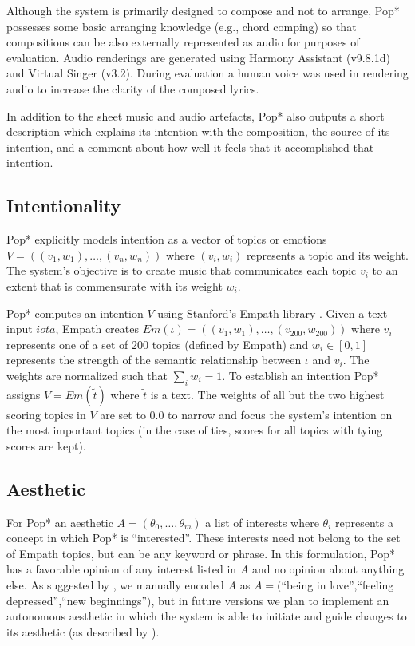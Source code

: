 \documentclass[phd,electronic,oneside,twosidetoc,letterpaper,chaptercenter,parttop,lol,lof,lot]{byumsphd}
\begin{document}
Although the system is primarily designed to compose and not to arrange, Pop* possesses some basic arranging knowledge (e.g., chord comping) so that compositions can be also externally represented as audio for purposes of evaluation. Audio renderings are generated using Harmony Assistant (v9.8.1d) and Virtual Singer (v3.2). During evaluation a human voice was used in rendering audio to increase the clarity of the composed lyrics. 

In addition to the sheet music and audio artefacts, Pop* also outputs a short description which explains its intention with the composition, the source of its intention, and a comment about how well it feels that it accomplished that intention.

\subsection{Intentionality}

Pop* explicitly models intention as a vector of topics or emotions $V=((v_1,w_1),\dots,(v_n,w_n))$ where $(v_i,w_i)$ represents a topic and its weight. The system's objective is to create music that communicates each topic $v_i$ to an extent that is commensurate with its weight $w_i$. 

Pop* computes an intention $V$ using Stanford's Empath library \citep{Fast2016}. Given a text input $iota$, Empath creates $Em(\iota)=((v_1,w_1),\dots,(v_{200},w_{200}))$ where $v_i$ represents one of a set of 200 topics (defined by Empath) and $w_i\in[0,1]$ represents the strength of the semantic relationship between $\iota$ and $v_i$. The weights are normalized such that $\sum_i w_i = 1$. To establish an intention Pop* assigns $V=Em(\tilde{t})$ where $\tilde{t}$ is a text. The weights of all but the two highest scoring topics in $V$ are set to 0.0 to narrow and focus the system's intention on the most important topics (in the case of ties, scores for all topics with tying scores are kept).

\subsection{Aesthetic}

For Pop* an aesthetic $A = (\theta_0,\dots,\theta_m)$ a list of interests where $\theta_i$ represents a concept in which Pop* is ``interested''. These interests need not belong to the set of Empath topics, but can be any keyword or phrase. In this formulation, Pop* has a favorable opinion of any interest listed in $A$ and no opinion about anything else. As suggested by \cite{Ventura2017HowSystem}, we manually encoded $A$ as $A=($``being in love'',``feeling depressed'',``new beginnings''$)$, but in future versions we plan to implement an autonomous aesthetic in which the system is able to initiate and guide changes to its aesthetic (as described by \cite{Jennings2010DevelopingIntelligence}).
\end{document}
